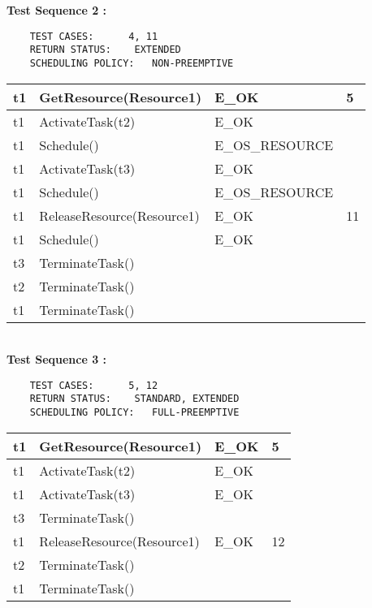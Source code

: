 \documentclass[10pt]{article}
\newlength{\Li}\settowidth{\Li}{Running}
\newlength{\Lii}\setlength{\Lii}{7cm}
\newlength{\Liiii}\setlength{\Liiii}{0.9cm}
\newlength{\Liii}\setlength{\Liii}{\textwidth} \addtolength{\Liii}{-\Li} \addtolength{\Liii}{-\Lii} \addtolength{\Liii}{-\Liiii}
\begin{document}
	\textbf{Test Sequence 2 :} 
	\begin{lstlisting}
	TEST CASES:		 4, 11
	RETURN STATUS:	  EXTENDED
	SCHEDULING POLICY:   NON-PREEMPTIVE
	\end{lstlisting}
	

	\begin{supertabular}{|p{\Li}|p{\Lii}|p{\Liii}|p{\Liiii}|} \hline 
	t1 & GetResource(Resource1) 				& E\_OK 				& 5 \\ \hline
	t1 & ActivateTask(t2)						& E\_OK 				& \\ \hline
	t1 & Schedule()							& E\_OS\_RESOURCE	& \\ \hline 
	t1 & ActivateTask(t3)						& E\_OK 				& \\ \hline
	t1 & Schedule()							& E\_OS\_RESOURCE	& \\ \hline 
	t1 & ReleaseResource(Resource1) 			& E\_OK 				& 11 \\ \hline
	t1 & Schedule()							& E\_OK				& \\ \hline 
	t3 & TerminateTask()					& 					&  \\ \hline
	t2 & TerminateTask() 					& 					&  \\ \hline
	t1 & TerminateTask()					& 					&  \\ \hline
	\end{supertabular} \\
	
	\textbf{Test Sequence 3 :} 
	\begin{lstlisting}
	TEST CASES:		 5, 12
	RETURN STATUS:	  STANDARD, EXTENDED
	SCHEDULING POLICY:   FULL-PREEMPTIVE
	\end{lstlisting}
	

	\begin{supertabular}{|p{\Li}|p{\Lii}|p{\Liii}|p{\Liiii}|} \hline 
	t1 & GetResource(Resource1) 				& E\_OK 				& 5 \\ \hline
	t1 & ActivateTask(t2)						& E\_OK 				& \\ \hline 
	t1 & ActivateTask(t3)						& E\_OK 				& \\ \hline
	t3 & TerminateTask()					& 					&  \\ \hline 
	t1 & ReleaseResource(Resource1) 			& E\_OK 				& 12 \\ \hline 
	t2 & TerminateTask() 					& 					&  \\ \hline
	t1 & TerminateTask()					& 					&  \\ \hline
	\end{supertabular} \\
	
\end{document}
